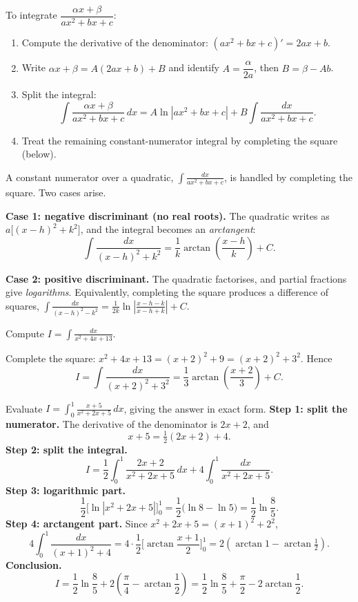 \documentclass[11pt]{article}
\newcommand{\cle}[1]{{\popxbold\color{popdark}#1}}
\newcounter{popsec}
\newcounter{popsub}
\newcommand{\courssub}[1]{%
  \stepcounter{popsub}%
  \par\vspace{9pt}\noindent{\popxbold\fontsize{11.5}{13}\selectfont\color{popink}{\color{poporange}\thepopsec.\thepopsub}\hspace{6pt}#1}\par\nopagebreak\vspace{4pt}
}
\begin{document}
\begin{methode}
To integrate $\dfrac{\alpha x+\beta}{ax^{2}+bx+c}$:
\begin{enumerate}
\item Compute the derivative of the denominator: $(ax^{2}+bx+c)'=2ax+b$.
\item Write $\alpha x+\beta = A(2ax+b)+B$ and identify $A=\dfrac{\alpha}{2a}$, then $B=\beta-Ab$.
\item Split the integral:
\[
\int\frac{\alpha x+\beta}{ax^{2}+bx+c}\,dx
=A\ln\left|ax^{2}+bx+c\right|+B\int\frac{dx}{ax^{2}+bx+c}.
\]
\item Treat the remaining constant-numerator integral by completing the square (below).
\end{enumerate}
\end{methode}

\courssub{Completing the Square}

A constant numerator over a quadratic, $\displaystyle\int\frac{dx}{ax^{2}+bx+c}$, is handled by \cle{completing the square}. Two cases arise.

\textbf{Case 1: negative discriminant (no real roots).} The quadratic writes as $a\big[(x-h)^{2}+k^{2}\big]$, and the integral becomes an \emph{arctangent}:
\[
\int\frac{dx}{(x-h)^{2}+k^{2}}=\frac{1}{k}\arctan\!\left(\frac{x-h}{k}\right)+C .
\]

\textbf{Case 2: positive discriminant.} The quadratic factorises, and partial fractions give \emph{logarithms}. Equivalently, completing the square produces a difference of squares, $\int\frac{dx}{(x-h)^{2}-k^{2}}=\frac{1}{2k}\ln\left|\frac{x-h-k}{x-h+k}\right|+C$.

\begin{exemplebox}
Compute $\displaystyle I=\int \frac{dx}{x^{2}+4x+13}$.

Complete the square: $x^{2}+4x+13=(x+2)^{2}+9=(x+2)^{2}+3^{2}$. Hence
\[
I=\int\frac{dx}{(x+2)^{2}+3^{2}}=\frac{1}{3}\arctan\!\left(\frac{x+2}{3}\right)+C .
\]
\end{exemplebox}

\begin{exoresolu}
Evaluate $\displaystyle I=\int_{0}^{1}\frac{x+5}{x^{2}+2x+5}\,dx$, giving the answer in exact form.
\tcblower
\textbf{Step 1: split the numerator.} The derivative of the denominator is $2x+2$, and
\[
x+5=\tfrac{1}{2}(2x+2)+4 .
\]
\textbf{Step 2: split the integral.}
\[
I=\frac{1}{2}\int_{0}^{1}\frac{2x+2}{x^{2}+2x+5}\,dx+4\int_{0}^{1}\frac{dx}{x^{2}+2x+5}.
\]
\textbf{Step 3: logarithmic part.}
\[
\frac{1}{2}\Big[\ln\left|x^{2}+2x+5\right|\Big]_{0}^{1}=\frac{1}{2}\big(\ln 8-\ln 5\big)=\frac{1}{2}\ln\frac{8}{5}.
\]
\textbf{Step 4: arctangent part.} Since $x^{2}+2x+5=(x+1)^{2}+2^{2}$,
\[
4\int_{0}^{1}\frac{dx}{(x+1)^{2}+4}
=4\cdot\frac{1}{2}\Big[\arctan\frac{x+1}{2}\Big]_{0}^{1}
=2\left(\arctan 1-\arctan\tfrac{1}{2}\right).
\]
\textbf{Conclusion.}
\[
I=\frac{1}{2}\ln\frac{8}{5}+2\left(\frac{\pi}{4}-\arctan\frac{1}{2}\right)
=\frac{1}{2}\ln\frac{8}{5}+\frac{\pi}{2}-2\arctan\frac{1}{2}.
\]
\end{exoresolu}
\end{document}

